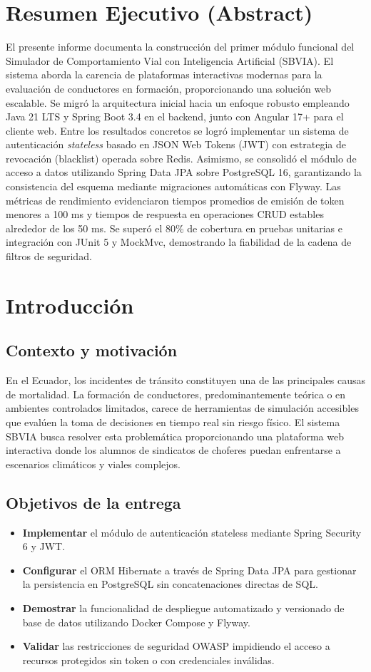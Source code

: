 \documentclass[12pt]{article}
\begin{document}
\section{Resumen Ejecutivo (Abstract)}
El presente informe documenta la construcción del primer módulo funcional del Simulador de Comportamiento Vial con Inteligencia Artificial (SBVIA). El sistema aborda la carencia de plataformas interactivas modernas para la evaluación de conductores en formación, proporcionando una solución web escalable. Se migró la arquitectura inicial hacia un enfoque robusto empleando Java 21 LTS y Spring Boot 3.4 en el backend, junto con Angular 17+ para el cliente web. Entre los resultados concretos se logró implementar un sistema de autenticación \textit{stateless} basado en JSON Web Tokens (JWT) con estrategia de revocación (blacklist) operada sobre Redis. Asimismo, se consolidó el módulo de acceso a datos utilizando Spring Data JPA sobre PostgreSQL 16, garantizando la consistencia del esquema mediante migraciones automáticas con Flyway. Las métricas de rendimiento evidenciaron tiempos promedios de emisión de token menores a 100 ms y tiempos de respuesta en operaciones CRUD estables alrededor de los 50 ms. Se superó el 80\% de cobertura en pruebas unitarias e integración con JUnit 5 y MockMvc, demostrando la fiabilidad de la cadena de filtros de seguridad.

\section{Introducción}
\subsection{Contexto y motivación}
En el Ecuador, los incidentes de tránsito constituyen una de las principales causas de mortalidad. La formación de conductores, predominantemente teórica o en ambientes controlados limitados, carece de herramientas de simulación accesibles que evalúen la toma de decisiones en tiempo real sin riesgo físico. El sistema SBVIA busca resolver esta problemática proporcionando una plataforma web interactiva donde los alumnos de sindicatos de choferes puedan enfrentarse a escenarios climáticos y viales complejos. 

\subsection{Objetivos de la entrega}
\begin{itemize}
    \item \textbf{Implementar} el módulo de autenticación stateless mediante Spring Security 6 y JWT.
    \item \textbf{Configurar} el ORM Hibernate a través de Spring Data JPA para gestionar la persistencia en PostgreSQL sin concatenaciones directas de SQL.
    \item \textbf{Demostrar} la funcionalidad de despliegue automatizado y versionado de base de datos utilizando Docker Compose y Flyway.
    \item \textbf{Validar} las restricciones de seguridad OWASP impidiendo el acceso a recursos protegidos sin token o con credenciales inválidas.
\end{itemize}
\end{document}
